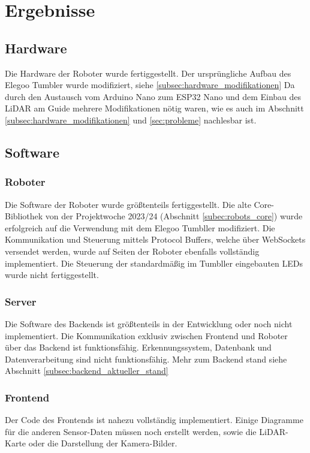 \chapter{Ergebnisse}

\section{Hardware}
Die Hardware der Roboter wurde fertiggestellt.
Der ursprüngliche Aufbau des Elegoo Tumbler wurde modifiziert, siehe \ref{subsec:hardware_modifikationen}
Da durch den Austausch vom Arduino Nano zum ESP32 Nano und dem Einbau des LiDAR am Guide
mehrere Modifikationen nötig waren,
wie es auch im Abschnitt \ref{subsec:hardware_modifikationen} und \ref{sec:probleme} nachlesbar ist.
\section{Software}

\subsection{Roboter}
Die Software der Roboter wurde größtenteils fertiggestellt.
%
Die alte Core-Bibliothek von der Projektwoche 2023/24 (Abschnitt \ref{subec:robots_core})
wurde erfolgreich auf die Verwendung mit dem Elegoo Tumbller modifiziert.
%
Die Kommunikation und Steuerung mittels Protocol Buffers,
welche über WebSockets versendet werden,
wurde auf Seiten der Roboter ebenfalls vollständig implementiert.
%
Die Steuerung der standardmäßig im Tumbller eingebauten LEDs wurde nicht fertiggestellt.
\subsection{Server}
Die Software des Backends ist größtenteils in der Entwicklung 
oder noch nicht implementiert.
% 
Die Kommunikation exklusiv zwischen Frontend und Roboter 
über das Backend ist funktionsfähig.
% 
Erkennungssystem, Datenbank und Datenverarbeitung sind nicht funktionsfähig.
% 
% 
Mehr zum Backend stand siehe Abschnitt \ref{subsec:backend_aktueller_stand}
% 
\subsection{Frontend}
Der Code des Frontends ist nahezu vollständig implementiert.
%
Einige Diagramme für die anderen Sensor-Daten müssen noch erstellt werden,
sowie die LiDAR-Karte oder die Darstellung der Kamera-Bilder.

